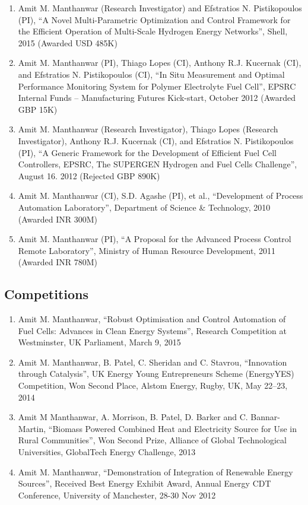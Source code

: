 \documentclass[10pt]{article}
\begin{document}
\begin{enumerate}[nosep]
\item Amit M. Manthanwar (Research Investigator) and Efstratios N. Pistikopoulos (PI), ``A Novel Multi-Parametric Optimization and Control Framework for the Efficient Operation of Multi-Scale Hydrogen Energy Networks'', Shell, 2015 (Awarded USD 485K)

\item Amit M. Manthanwar (PI), Thiago Lopes (CI), Anthony R.J. Kucernak (CI), and Efstratios N. Pistikopoulos (CI), ``In Situ Measurement and Optimal Performance Monitoring System for Polymer Electrolyte Fuel Cell'', EPSRC Internal Funds – Manufacturing Futures Kick-start, October 2012 (Awarded GBP 15K)

\item Amit M. Manthanwar (Research Investigator), Thiago Lopes (Research Investigator), Anthony R.J. Kucernak (CI), and Efstratios N. Pistikopoulos (PI), ``A Generic Framework for the Development of Efficient Fuel Cell Controllers, EPSRC, The SUPERGEN Hydrogen and Fuel Cells Challenge'', August 16. 2012 (Rejected GBP 890K)

\item Amit M. Manthanwar (CI), S.D. Agashe (PI), et al., ``Development of
Process Automation Laboratory'', Department of Science \& Technology, 2010 (Awarded INR 300M)

\item Amit M. Manthanwar (PI), ``A Proposal for the Advanced Process Control Remote Laboratory'', Ministry of Human Resource Development, 2011 (Awarded INR 780M)

\end{enumerate}


\subsection{Competitions}
\begin{enumerate}[nosep]
\item Amit M. Manthanwar, ``Robust Optimisation and Control Automation of Fuel Cells: Advances in Clean Energy Systems'', Research Competition at Westminster, UK Parliament, March 9, 2015

\item Amit M. Manthanwar, B. Patel, C. Sheridan and C. Stavrou, ``Innovation through Catalysis'', UK Energy Young Entrepreneurs Scheme (EnergyYES) Competition, Won Second Place, Alstom Energy,  Rugby, UK, May 22–23, 2014

\item Amit M Manthanwar, A. Morrison, B. Patel, D. Barker and C. Bannar-Martin, ``Biomass Powered Combined Heat and Electricity Source for Use in Rural Communities'', Won Second Prize, Alliance of Global Technological Universities, GlobalTech Energy Challenge, 2013

\item Amit M. Manthanwar, ``Demonstration of Integration of Renewable Energy Sources'', Received Best Energy Exhibit Award, Annual Energy CDT Conference, University of Manchester, 28-30 Nov 2012
\end{enumerate}
\end{document}
